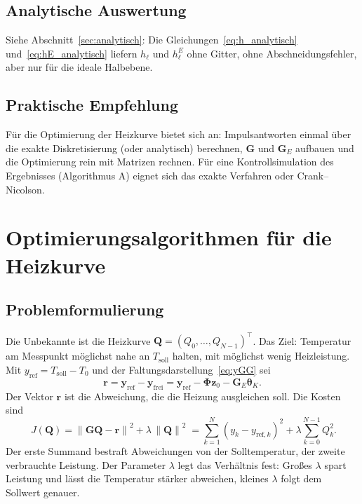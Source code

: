 \documentclass[11pt,a4paper]{article}
\numberwithin{equation}{section}
\newcommand{\vthK}{\symbf{\theta}_{K}}
\newcommand{\mG}{\mathbf{G}}
\newcommand{\mGE}{\mathbf{G}_{E}}
\newcommand{\mPhi}{\symbf{\Phi}}
\newcommand{\vz}{\mathbf{z}}
\newcommand{\vy}{\mathbf{y}}
\newcommand{\vQ}{\mathbf{Q}}
\newcommand{\vr}{\mathbf{r}}
\newcommand{\norm}[1]{\left\lVert #1\right\rVert}
\begin{document}
\subsection{Analytische Auswertung}

Siehe Abschnitt~\ref{sec:analytisch}: Die Gleichungen~\eqref{eq:h_analytisch} und~\eqref{eq:hE_analytisch} liefern $h_\ell$ und $h^E_\ell$ ohne Gitter, ohne Abschneidungsfehler, aber nur für die ideale Halbebene.

\subsection{Praktische Empfehlung}

Für die Optimierung der Heizkurve bietet sich an: Impulsantworten einmal über die exakte Diskretisierung (oder analytisch) berechnen, $\mG$ und $\mGE$ aufbauen und die Optimierung rein mit Matrizen rechnen. Für eine Kontrollsimulation des Ergebnisses (Algorithmus A) eignet sich das exakte Verfahren oder Crank--Nicolson.

\section{Optimierungsalgorithmen für die Heizkurve}
\label{sec:opt}

\subsection{Problemformulierung}

Die Unbekannte ist die Heizkurve $\vQ=(Q_0,\dots,Q_{N-1})^\top$. Das Ziel: Temperatur am Messpunkt möglichst nahe an $T_\mathrm{soll}$ halten, mit möglichst wenig Heizleistung. Mit $y_\mathrm{ref}=T_\mathrm{soll}-T_0$ und der Faltungsdarstellung~\eqref{eq:yGG} sei
\begin{equation}
 \vr=\vy_\mathrm{ref}-\vy_\mathrm{frei}=\vy_\mathrm{ref}-\mPhi\vz_0-\mGE\vthK .
\end{equation}
Der Vektor $\vr$ ist die Abweichung, die die Heizung ausgleichen soll. Die Kosten sind
\begin{equation}
 \boxed{\;J(\vQ)=\norm{\mG\vQ-\vr}^2+\lambda\,\norm{\vQ}^2\;}
 =\sum_{k=1}^{N}(y_k-y_{\mathrm{ref},k})^2+\lambda\sum_{k=0}^{N-1}Q_k^2 .
\end{equation}
Der erste Summand bestraft Abweichungen von der Solltemperatur, der zweite verbrauchte Leistung. Der Parameter $\lambda$ legt das Verhältnis fest: Großes $\lambda$ spart Leistung und lässt die Temperatur stärker abweichen, kleines $\lambda$ folgt dem Sollwert genauer.
\end{document}
